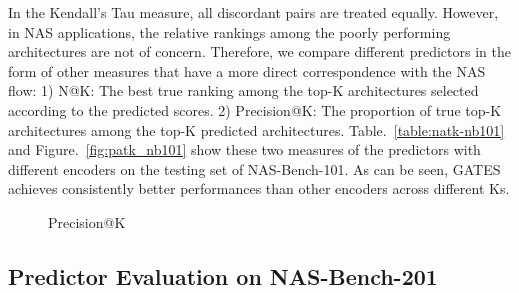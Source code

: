 \documentclass[runningheads]{llncs}
\begin{document}
In the Kendall's Tau measure, all discordant pairs are treated equally. However, in NAS applications, the relative rankings among the poorly performing architectures are not of concern. Therefore, we compare different predictors in the form of other measures that have a more direct correspondence with the NAS flow: 1) N@K: The best true ranking among the top-K architectures selected according to the predicted scores. 2) Precision@K: The proportion of true top-K architectures among the top-K predicted architectures. Table.~\ref{table:natk-nb101} and Figure.~\ref{fig:patk_nb101} show these two measures of the predictors with different encoders on the testing set of NAS-Bench-101. As can be seen, GATES achieves consistently better performances than other encoders across different Ks.

\begin{figure}[tb]
  \begin{center}
    \vspace{-10pt}
    \caption{Precision@K}
  \end{center}
  \label{fig:patk}
  \vspace{-15pt}
\end{figure}


\subsection{Predictor Evaluation on NAS-Bench-201}
\label{sec:exp-nasbench201}
\end{document}
